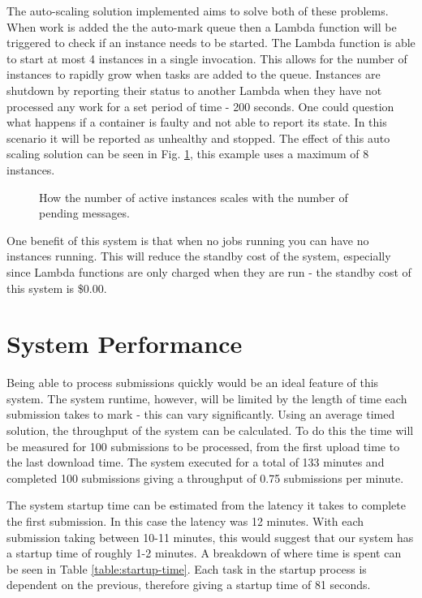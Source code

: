 \documentclass[runningheads]{llncs}
\begin{document}
The auto-scaling solution implemented aims to solve both of these problems. When work is added the the auto-mark queue then a Lambda function will be triggered to check if an instance needs to be started. The Lambda function is able to start at most 4 instances in a single invocation. This allows for the number of instances to rapidly grow when tasks are added to the queue. Instances are shutdown by reporting their status to another Lambda when they have not processed any work for a set period of time - 200 seconds. One could question what happens if a container is faulty and not able to report its state. In this scenario it will be reported as unhealthy and stopped. The effect of this auto scaling solution can be seen in Fig. \ref{fig:scale-graph}, this example uses a maximum of 8 instances.

\begin{figure}[ht]
    \vspace{-1em}
    \centering
    
    \caption{How the number of active instances scales with the number of pending messages.}
    \label{fig:scale-graph}
    \vspace{-1em}
\end{figure}

One benefit of this system is that when no jobs running you can have no instances running. This will reduce the standby cost of the system, especially since Lambda functions are only charged when they are run - the standby cost of this system is \$0.00.



\section{System Performance}
Being able to process submissions quickly would be an ideal feature of this system. The system runtime, however, will be limited by the length of time each submission takes to mark - this can vary significantly. Using an average timed solution, the throughput of the system can be calculated. To do this the time will be measured for 100 submissions to be processed, from the first upload time to the last download time. The system executed for a total of 133 minutes and completed 100 submissions giving a throughput of 0.75 submissions per minute. 

The system startup time can be estimated from the latency it takes to complete the first submission. In this case the latency was 12 minutes. With each submission taking between 10-11 minutes, this would suggest that our system has a startup time of roughly 1-2 minutes. A breakdown of where time is spent can be seen in Table \ref{table:startup-time}. Each task in the startup process is dependent on the previous, therefore giving a startup time of 81 seconds. 
\end{document}
